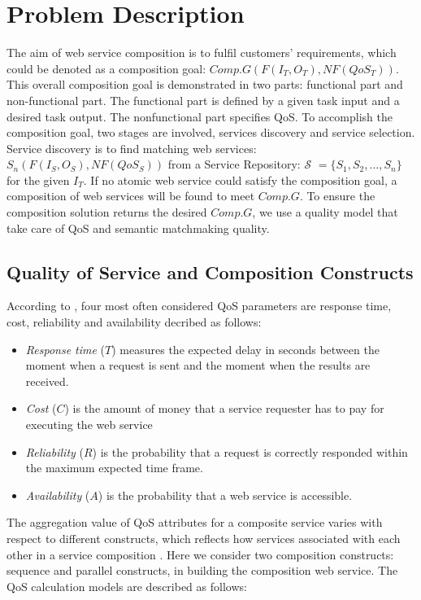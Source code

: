 \documentclass{IEEEtran}
\begin{document}
\section{Problem Description}\label{problemDes}

The aim of web service composition is to fulfil customers' requirements, which could be denoted as a composition goal: $Comp.G(F(I_{T}, O_{T}), NF(QoS_{T}))$. This overall composition goal is demonstrated in two parts: functional part and non-functional part. The functional part is defined by a given task input and a desired task output. The nonfunctional part specifies QoS. To accomplish the composition goal, two stages are involved, services discovery and service selection. Service discovery is to find matching web services: $S_{n}(F(I_{S}, O_{S}), NF(QoS_{S}))$ from a Service Repository: $\mathcal{S}$ $=  \{S_{1}, S_{2},..., S_{n} \}$ for the given $I_{T}$. If no atomic web service could satisfy the composition goal, a composition of web services will be found to meet $Comp.G$. To ensure the composition solution returns the desired $Comp.G$, we use a quality model that take care of QoS and semantic matchmaking quality.

\subsection{Quality of Service and Composition Constructs}\label{Quality of Service and Composition Constructs}
According to \cite{zeng2003quality}, four most often considered QoS parameters are response time, cost, reliability and availability decribed as follows:
\begin{itemize}
\item \textit{Response time} ($T$) measures the expected delay in seconds between the moment when a request is sent and the moment when the results are received.
\item \textit{Cost} ($C$) is the amount of money that a service requester has to pay for executing the web service
\item \textit{Reliability} ($R$) is the probability that a request is correctly responded within the maximum expected time frame.
\item \textit{Availability} ($A$) is the probability that a web service is accessible.
\end{itemize}
The aggregation value of QoS attributes for a composite service varies with respect to different constructs, which reflects how services associated with each other in a service composition \cite{zeng2003quality}. Here we consider two composition constructs: sequence and parallel constructs, in building the composition web service. The QoS calculation models are described as follows:
\end{document}
